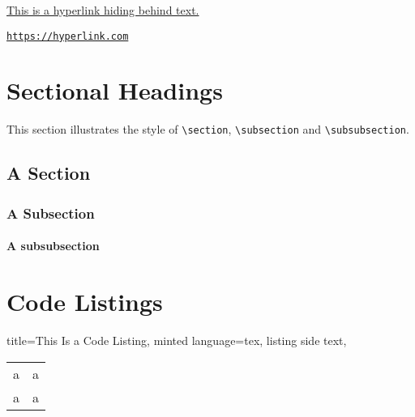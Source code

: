 \documentclass[a4paper,11pt,oneside,showtrims]{alpenthesis}
\begin{document}
\href{https://hyperlink.com}{This is a hyperlink hiding behind text.}

\href{https://hyperlink.com}{\nolinkurl{https://hyperlink.com}}

\chapter{Sectional Headings}

This section illustrates the  style of \verb|\section|, \verb|\subsection| and
\verb|\subsubsection|.

\section{A Section}
\lipsum[2]

\subsection{A Subsection}
\lipsum[1]

\subsubsection{A subsubsection}
\lipsum[2]

\chapter{Code Listings}
\tikzset{external/export next=false}%
\begin{tcblisting}{%
        title=This Is a Code Listing,
        minted language=tex,
        listing side text,
        }
    \begin{tabular}{ll}
        a & a \\
        a & a \\
    \end{tabular}
\end{tcblisting}

\tikzset{external/export next=false}%
\begin{tcolorbox}[title=test]
    \lipsum[2]
\end{tcolorbox}
\end{document}
